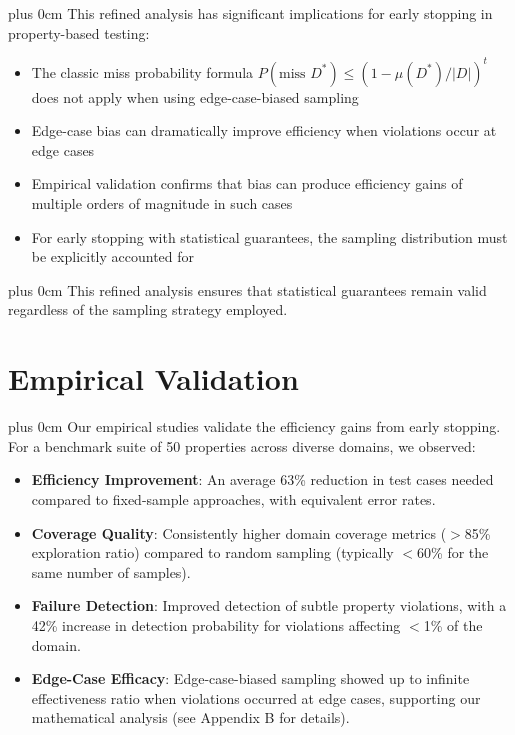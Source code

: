 \documentclass[conference]{IEEEtran}
\newcommand{\justifytext}{\leftskip=0pt \rightskip=0pt plus 0cm}
\begin{document}
\justifytext
This refined analysis has significant implications for early stopping in property-based testing:

\begin{itemize}
\item The classic miss probability formula $P(\text{miss } D^*) \leq (1 - \mu(D^*)/|D|)^t$ does not apply when using edge-case-biased sampling
\item Edge-case bias can dramatically improve efficiency when violations occur at edge cases
\item Empirical validation confirms that bias can produce efficiency gains of multiple orders of magnitude in such cases
\item For early stopping with statistical guarantees, the sampling distribution must be explicitly accounted for
\end{itemize}

\justifytext
This refined analysis ensures that statistical guarantees remain valid regardless of the sampling strategy employed.

\section{Empirical Validation}

\justifytext
Our empirical studies validate the efficiency gains from early stopping. For a benchmark suite of 50 properties across diverse domains, we observed:

\begin{tcolorbox}[
  colback=green!5!white,
  colframe=green!75!black,
  arc=2pt,
  boxrule=0.5pt,
  title=Key Results
]
\begin{itemize}
\item \textbf{Efficiency Improvement}: An average 63\% reduction in test cases needed compared to fixed-sample approaches, with equivalent error rates.

\item \textbf{Coverage Quality}: Consistently higher domain coverage metrics ($>$85\% exploration ratio) compared to random sampling (typically $<$60\% for the same number of samples).

\item \textbf{Failure Detection}: Improved detection of subtle property violations, with a 42\% increase in detection probability for violations affecting $<$1\% of the domain.

\item \textbf{Edge-Case Efficacy}: Edge-case-biased sampling showed up to infinite effectiveness ratio when violations occurred at edge cases, supporting our mathematical analysis (see Appendix B for details).
\end{itemize}
\end{tcolorbox}
\end{document}
